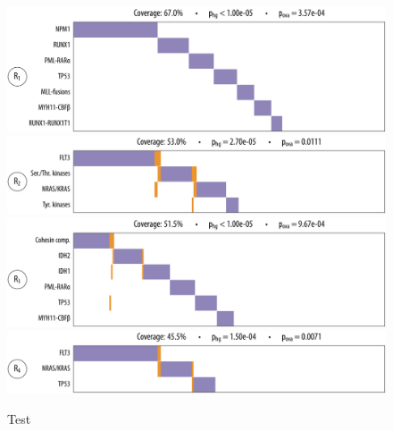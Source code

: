 \begin{figure}[htbp]
\centering
\includegraphics[width=\textwidth]{figures/genes/aml_1.pdf}\\[2em]
\includegraphics[width=\textwidth]{figures/genes/aml_2.pdf}\\[2em]
\includegraphics[width=\textwidth]{figures/genes/aml_3.pdf}\\[2em]
\includegraphics[width=\textwidth]{figures/genes/aml_4.pdf}\\[2em]
\caption{Test}
\end{figure}

